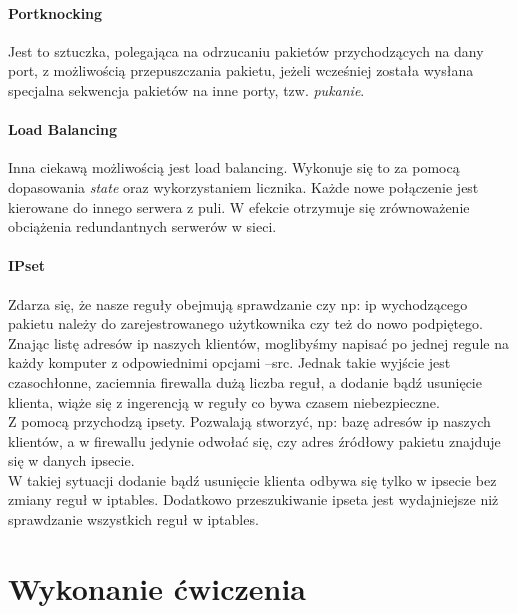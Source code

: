 \documentclass[a4paper,12pt]{article}
\begin{document}
\subsection{Portknocking}
Jest to sztuczka, polegająca na odrzucaniu pakietów przychodzących na dany port, z możliwością przepuszczania pakietu, jeżeli wcześniej została wysłana specjalna sekwencja pakietów na inne porty, tzw. \textit{pukanie}.
\subsection{Load Balancing}
Inna ciekawą możliwością jest load balancing. Wykonuje się to za pomocą dopasowania \textit{state} oraz wykorzystaniem licznika. Każde nowe połączenie jest kierowane do innego serwera z puli. W efekcie otrzymuje się zrównoważenie obciążenia redundantnych serwerów w sieci.
\subsection{IPset}
Zdarza się, że nasze reguły obejmują sprawdzanie czy np: ip wychodzącego pakietu należy do zarejestrowanego użytkownika czy też do nowo podpiętego. Znając listę adresów ip naszych klientów, moglibyśmy napisać po jednej regule na każdy komputer z odpowiednimi opcjami --src. Jednak takie wyjście jest czasochłonne, zaciemnia firewalla dużą liczba reguł, a dodanie bądź usunięcie klienta, wiąże się z ingerencją w reguły co bywa czasem niebezpieczne.\\
Z pomocą przychodzą ipsety. Pozwalają stworzyć, np: bazę adresów ip naszych klientów, a w firewallu jedynie odwołać się, czy adres źródłowy pakietu znajduje się w danych ipsecie.\\
W takiej sytuacji dodanie bądź usunięcie klienta odbywa się tylko w ipsecie bez zmiany reguł w iptables. Dodatkowo przeszukiwanie ipseta jest wydajniejsze niż sprawdzanie wszystkich reguł w iptables.
\part{Wykonanie ćwiczenia}
\end{document}
